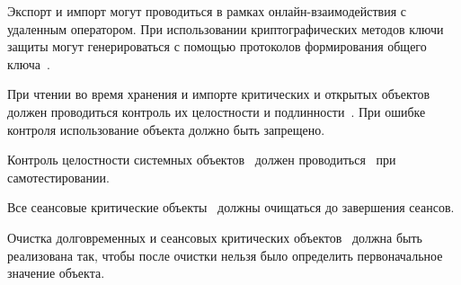 \begin{note}
Экспорт и импорт могут проводиться в рамках онлайн-взаимодействия с удаленным
оператором. При использовании криптографических методов ключи защиты 
могут генерироваться с помощью протоколов формирования общего 
ключа~.
\end{note}

\label{R.DP.Import} %
При чтении во время хранения и импорте критических и открытых объектов  
должен проводиться контроль их целостности и подлинности~. 
При ошибке контроля использование объекта должно быть запрещено. 

\label{R.DP.System} %
Контроль целостности системных объектов~ 
должен проводиться~ при самотестировании.

\label{R.DP.Session} %
Все сеансовые критические объекты~
должны очищаться до завершения сеансов.

\label{R.DP.Zero} %
Очистка долговременных и сеансовых критических объектов~ 
должна быть реализована так, чтобы после очистки нельзя было определить 
первоначальное значение объекта. 

\label{R.DP.NonExtr} %

